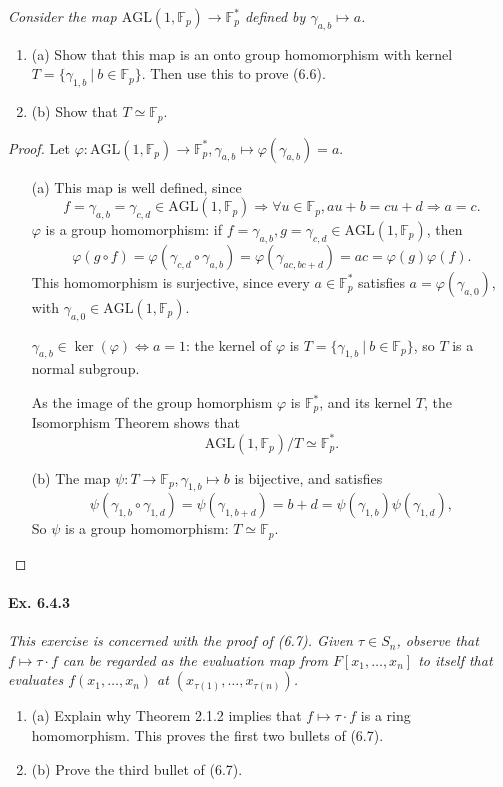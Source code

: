 \documentclass[11pt,a4paper]{article}
\newcommand{\be} {\begin{enumerate}}
\newcommand{\ee} {\end{enumerate}}
\newcommand{\F}{\mathbb{F}}
\begin{document}
{\it Consider the map $\mathrm{AGL}(1,\F_p) \to \F_p^*$ defined by $\gamma_{a,b} \mapsto a$.
\be
\item[(a)] Show that this map is an onto group homomorphism with kernel $T = \{\gamma_{1,b} \ | \ b\in \F_p\}$. Then use this to prove (6.6).
\item[(b)] Show that $T \simeq \F_p$.
\ee
}

\begin{proof}
Let $\varphi :  \mathrm{AGL}(1,\F_p) \to \F_p^*, \gamma_{a,b} \mapsto  \varphi(\gamma_{a,b}) =a$.
\begin{enumerate}
\item[(a)] This map is well defined, since 
$$f = \gamma_{a,b} = \gamma_{c,d} \in \mathrm{AGL}(1,\F_p) \Rightarrow \forall u \in \F_p, au+b = cu+d \Rightarrow a=c.$$
$\varphi$ is a group homomorphism: if $f = \gamma_{a,b} , g = \gamma_{c,d} \in \mathrm{AGL}(1,\F_p)$, then
$$\varphi(g\circ f) = \varphi(\gamma_{c,d} \circ \gamma_{a,b}) = \varphi(\gamma_{ac,bc+d}) = ac =\varphi(g) \varphi(f).$$
This homomorphism is surjective, since every  $a\in \F_p^*$ satisfies $a = \varphi(\gamma_{a,0})$, with $\gamma_{a,0} \in \mathrm{AGL}(1,\F_p)$.

$\gamma_{a,b} \in \ker(\varphi) \iff a = 1$: the kernel of $\varphi$ is $T = \{\gamma_{1,b} \ \vert  \ b \in \F_p\}$, so $T$ is a normal subgroup.

As the image of the group homorphism $\varphi$ is $\F_p^*$, and its kernel $T$, the Isomorphism Theorem shows that
$$\mathrm{AGL}(1,\F_p)/T \simeq \F_p^*.$$

\item[(b)]
The map $\psi : T \to \F_p, \gamma_{1,b} \mapsto b$ is bijective, and satisfies $$\psi(\gamma_{1,b} \circ \gamma_{1,d}) = \psi(\gamma_{1,b+d}) = b+d = \psi(\gamma_{1,b})\psi(\gamma_{1,d}),$$ 
So $\psi$ is a group homomorphism: $T \simeq \F_p$.

\end{enumerate}
\end{proof}

\paragraph{Ex. 6.4.3}

{\it This exercise is concerned with the proof of (6.7). Given $\tau \in S_n$, observe that $f\mapsto \tau \cdot f$ can be regarded as the evaluation map from $F[x_1,\ldots,x_n]$ to itself that evaluates $f(x_1,\ldots,x_n)$ at $(x_{\tau(1)},\ldots,x_{\tau(n)})$.
\be
\item[(a)] Explain why Theorem 2.1.2 implies that $f \mapsto \tau \cdot f$ is a ring homomorphism. This proves the first two bullets of (6.7).
\item[(b)] Prove the third bullet of (6.7).
\ee
}
\end{document}
